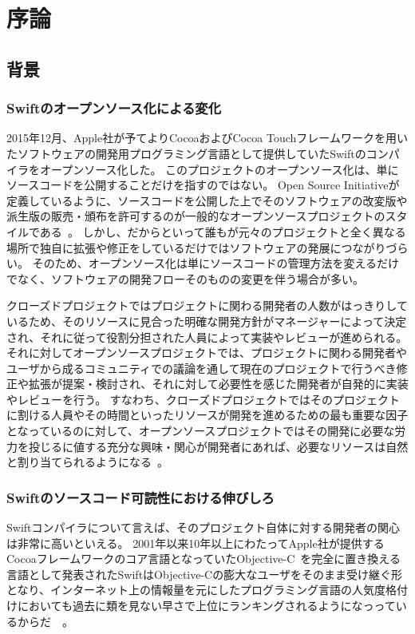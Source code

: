 \chapter{序論}
\label{introduction}

\section{背景}
\label{introduction:background}

\subsection{Swiftのオープンソース化による変化}

2015年12月、Apple社が予てよりCocoaおよびCocoa Touchフレームワークを用いたソフトウェアの開発用プログラミング言語として提供していたSwiftのコンパイラをオープンソース化した。
このプロジェクトのオープンソース化は、単にソースコードを公開することだけを指すのではない。
Open Source Initiativeが定義しているように、ソースコードを公開した上でそのソフトウェアの改変版や派生版の販売・頒布を許可するのが一般的なオープンソースプロジェクトのスタイルである~\cite{opensource}。
しかし、だからといって誰もが元々のプロジェクトと全く異なる場所で独自に拡張や修正をしているだけではソフトウェアの発展につながりづらい。
そのため、オープンソース化は単にソースコードの管理方法を変えるだけでなく、ソフトウェアの開発フローそのものの変更を伴う場合が多い。

クローズドプロジェクトではプロジェクトに関わる開発者の人数がはっきりしているため、そのリソースに見合った明確な開発方針がマネージャーによって決定され、それに従って役割分担された人員によって実装やレビューが進められる。
それに対してオープンソースプロジェクトでは、プロジェクトに関わる開発者やユーザから成るコミュニティでの議論を通して現在のプロジェクトで行うべき修正や拡張が提案・検討され、それに対して必要性を感じた開発者が自発的に実装やレビューを行う。
すなわち、クローズドプロジェクトではそのプロジェクトに割ける人員やその時間といったリソースが開発を進めるための最も重要な因子となっているのに対して、オープンソースプロジェクトではその開発に必要な労力を投じるに値する充分な興味・関心が開発者にあれば、必要なリソースは自然と割り当てられるようになる~\cite{raymond}。

\subsection{Swiftのソースコード可読性における伸びしろ}

Swiftコンパイラについて言えば、そのプロジェクト自体に対する開発者の関心は非常に高いといえる。
2001年以来10年以上にわたってApple社が提供するCocoaフレームワークのコア言語となっていたObjective-C~\cite{objective-c}を完全に置き換える言語として発表されたSwiftはObjective-Cの膨大なユーザをそのまま受け継ぐ形となり、インターネット上の情報量を元にしたプログラミング言語の人気度格付けにおいても過去に類を見ない早さで上位にランキングされるようになっっているからだ~\cite{tiobe}~\cite{redmonk}。

